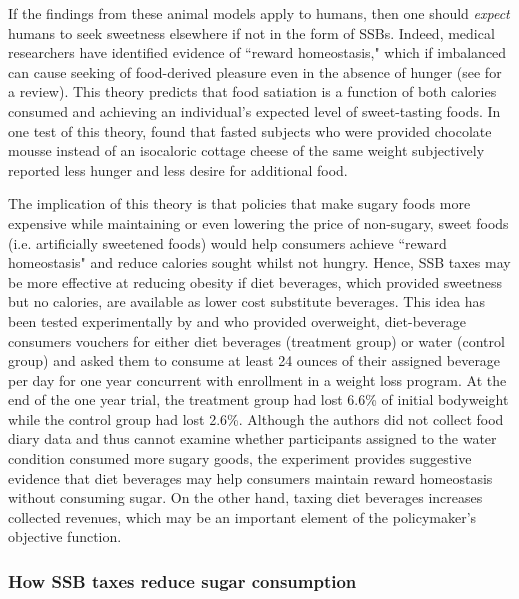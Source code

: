 \documentclass[12pt]{article}
\begin{document}
If the findings from these animal models apply to humans, then one should \textit{expect} humans to seek sweetness elsewhere if not in the form of SSBs. Indeed, medical researchers have identified evidence of ``reward homeostasis," which if imbalanced can cause seeking of food-derived pleasure even in the absence of hunger (see \textcite{bellisle2012sweetness} for a review). This theory predicts that food satiation is a function of both calories consumed and achieving an individual's expected level of sweet-tasting foods. In one test of this theory, \textcite{lemmens2009eating} found that fasted subjects who were provided chocolate mousse instead of an isocaloric cottage cheese of the same weight subjectively reported less hunger and less desire for additional food.

The implication of this theory is that policies that make sugary foods more expensive while maintaining or even lowering the price of non-sugary, sweet foods (i.e. artificially sweetened foods) would help consumers achieve ``reward homeostasis" and reduce calories sought whilst not hungry. Hence, SSB taxes may be more effective at reducing obesity if diet beverages, which provided sweetness but no calories, are available as lower cost substitute beverages. This idea has been tested experimentally by  \textcite{peters2014effects} and \textcite{peters2016effects} who provided overweight, diet-beverage consumers vouchers for either diet beverages (treatment group) or water (control group) and asked them to consume at least 24 ounces of their assigned beverage per day for one year concurrent with enrollment in a weight loss program. At the end of the one year trial, the treatment group had lost 6.6\% of initial bodyweight while the control group had lost 2.6\%. Although the authors did not collect food diary data and thus cannot examine whether participants assigned to the water condition consumed more sugary goods, the experiment provides suggestive evidence that diet beverages may help consumers maintain reward homeostasis without consuming sugar. On the other hand, taxing diet beverages increases collected revenues, which may be an important element of the policymaker's objective function.

\subsubsection{How SSB taxes reduce sugar consumption}
\end{document}
